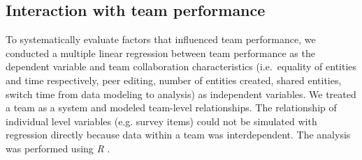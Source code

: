 \subsection{Interaction with team performance}

To systematically evaluate factors that influenced team performance,
we conducted a multiple linear regression between team performance
as the dependent variable and team collaboration characteristics
(i.e.~equality of entities and time respectively, peer editing, number of entities created, shared
entities, switch time from data modeling to analysis) as independent
variables. We treated a team as a system \cite{Henman2003b} and modeled team-level
relationships.
The relationship of individual level variables (e.g.
survey items) could not be simulated with regression directly because data within a team was interdependent. The analysis was performed using \emph{R} \cite{R2016}.

